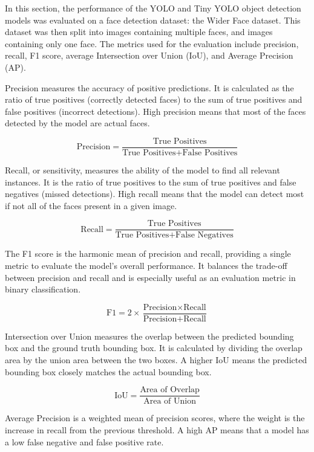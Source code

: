 In this section, the performance of the YOLO and Tiny YOLO object detection models was evaluated on a face detection dataset: the Wider Face dataset. This dataset was then split into images containing multiple faces, and images containing only one face. The metrics used for the evaluation include precision, recall, F1 score, average Intersection over Union (IoU), and Average Precision (AP).

Precision measures the accuracy of positive predictions. It is calculated as the ratio of true positives (correctly detected faces) to the sum of true positives and false positives (incorrect detections). High precision means that most of the faces detected by the model are actual faces.

\[
\text{Precision} = \frac{\text{True Positives}}{\text{True Positives} + \text{False Positives}}
\]
 
Recall, or sensitivity, measures the ability of the model to find all relevant instances. It is the ratio of true positives to the sum of true positives and false negatives (missed detections). High recall means that the model can detect most if not all of the faces present in a given image.

\[
\text{Recall} = \frac{\text{True Positives}}{\text{True Positives} + \text{False Negatives}}
\]

The F1 score is the harmonic mean of precision and recall, providing a single metric to evaluate the model's overall performance. It balances the trade-off between precision and recall and is especially useful as an evaluation metric in binary classification.

\[
\text{F1} = 2 \times \frac{\text{Precision} \times \text{Recall}}{\text{Precision} + \text{Recall}}
\]

Intersection over Union measures the overlap between the predicted bounding box and the ground truth bounding box. It is calculated by dividing the overlap area by the union area between the two boxes. A higher IoU means the predicted bounding box closely matches the actual bounding box.

\[
\text{IoU} = \frac{\text{Area of Overlap}}{\text{Area of Union}}
\]
 
Average Precision is a weighted mean of precision scores, where the weight is the increase in recall from the previous threshold. A high AP means that a model has a low false negative and false positive rate.

